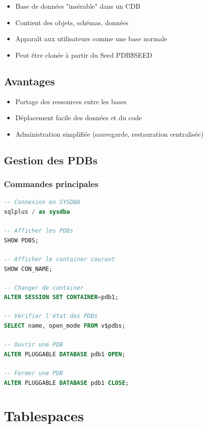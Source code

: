 \documentclass[12pt,a4paper]{article}
\begin{document}
\begin{itemize}
    \item Base de données "insérable" dans un CDB
    \item Contient des objets, schémas, données
    \item Apparaît aux utilisateurs comme une base normale
    \item Peut être clonée à partir du Seed PDB\$SEED
\end{itemize}

\subsection{Avantages}

\begin{itemize}
    \item Partage des ressources entre les bases
    \item Déplacement facile des données et du code
    \item Administration simplifiée (sauvegarde, restauration centralisée)
\end{itemize}

\subsection{Gestion des PDBs}

\subsubsection{Commandes principales}

\begin{lstlisting}[language=SQL]
-- Connexion en SYSDBA
sqlplus / as sysdba

-- Afficher les PDBs
SHOW PDBS;

-- Afficher le container courant
SHOW CON_NAME;

-- Changer de container
ALTER SESSION SET CONTAINER=pdb1;

-- Vérifier l'état des PDBs
SELECT name, open_mode FROM v$pdbs;

-- Ouvrir une PDB
ALTER PLUGGABLE DATABASE pdb1 OPEN;

-- Fermer une PDB
ALTER PLUGGABLE DATABASE pdb1 CLOSE;
\end{lstlisting}

\section{Tablespaces}
\end{document}
